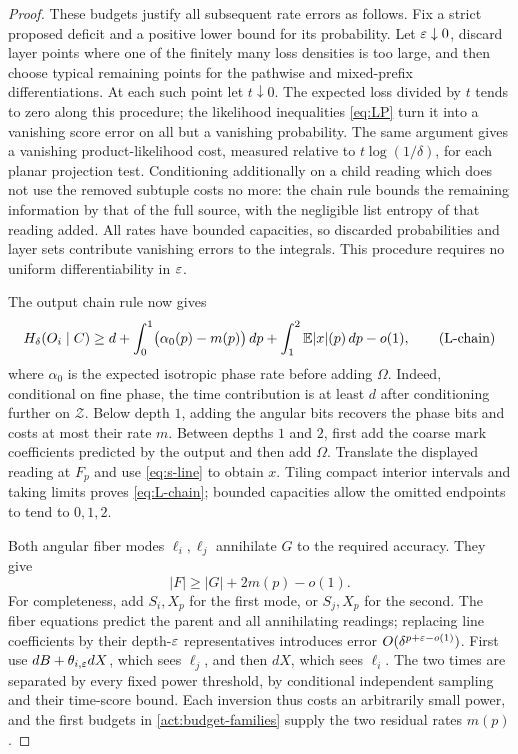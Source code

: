 \begin{proof}
These budgets justify all subsequent rate errors as follows.  Fix a
strict proposed deficit and a positive lower bound for its probability.
Let $\varepsilon\downarrow0$, discard layer points where one of the finitely
many loss densities is too large, and then choose typical remaining
points for the pathwise and mixed-prefix differentiations.  At each
such point let $t\downarrow0$.  The expected loss divided by $t$
tends to zero along this procedure; the likelihood inequalities
\eqref{eq:LP} turn it into a vanishing score error on all but a
vanishing probability.  The same argument gives a vanishing
product-likelihood cost, measured relative to $t\log(1/\delta)$,
for each planar projection test.  Conditioning additionally on a
child reading which does not use the removed subtuple costs no more:
the chain rule bounds the remaining information by that of the full
source, with the negligible list entropy of that reading added.
All rates have bounded capacities, so discarded probabilities and
layer sets contribute vanishing errors to the integrals.  This
procedure requires no uniform differentiability in $\varepsilon$.

The output chain rule now gives
\begin{equation}
 H_\delta(O_i\mid C)
 \ge d+\int_0^1\bigl(\alpha_0(p)-m(p)\bigr)\,dp
       +\int_1^2\mathbb E|x|(p)\,dp-o(1),
 \tag{L-chain}\label{eq:L-chain}
\end{equation}
where $\alpha_0$ is the expected isotropic phase rate before adding
$\Omega$.  Indeed, conditional on fine phase, the time contribution
is at least $d$ after conditioning further on $\mathscr Z$.
Below depth $1$, adding the angular bits recovers the phase bits and
costs at most their rate $m$.  Between depths $1$ and $2$, first add
the coarse mark coefficients predicted by the output and then add
$\Omega$.  Translate the displayed reading at $F_p$ and use
\eqref{eq:s-line} to obtain $x$.  Tiling compact interior intervals
and taking limits proves \eqref{eq:L-chain}; bounded capacities allow
the omitted endpoints to tend to $0,1,2$.

Both angular fiber modes $\ell_i,\ell_j$ annihilate $G$ to the
required accuracy.  They give
\begin{equation}
 |F|\ge |G|+2m(p)-o(1).
 \tag{L-mode}\label{eq:L-mode}
\end{equation}
For completeness, add $S_i,X_p$ for the first mode, or $S_j,X_p$
for the second.  The fiber equations predict the parent and all
annihilating readings; replacing line coefficients by their
depth-$\varepsilon$ representatives introduces error
$O(\delta^{p+\varepsilon-o(1)})$.  First use
$dB+\theta_{i,\varepsilon}dX$, which sees $\ell_j$, and then $dX$,
which sees $\ell_i$.  The two times are separated by every fixed
power threshold, by conditional independent sampling and their
time-score bound.  Each inversion thus costs an arbitrarily small
power, and the first budgets in \eqref{act:budget-families} supply
the two residual rates $m(p)$.


\end{proof}
